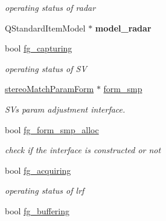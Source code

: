 \begin{DoxyCompactItemize}
\begin{DoxyCompactList}\small\item\em operating status of radar \end{DoxyCompactList}\item 
\hypertarget{class_main_window_a06bc8c3c6a08eafe409ee2bafe0ffbd6}{}Q\+Standard\+Item\+Model $\ast$ {\bfseries model\+\_\+radar}\label{class_main_window_a06bc8c3c6a08eafe409ee2bafe0ffbd6}

\item 
\hypertarget{class_main_window_aa898201d6efa2132f8bbec5b0cb2a54b}{}bool \hyperlink{class_main_window_aa898201d6efa2132f8bbec5b0cb2a54b}{fg\+\_\+capturing}\label{class_main_window_aa898201d6efa2132f8bbec5b0cb2a54b}

\begin{DoxyCompactList}\small\item\em operating status of S\+V \end{DoxyCompactList}\item 
\hypertarget{class_main_window_af7d1fe5d2623ace2d8c2918374297618}{}\hyperlink{classstereo_match_param_form}{stereo\+Match\+Param\+Form} $\ast$ \hyperlink{class_main_window_af7d1fe5d2623ace2d8c2918374297618}{form\+\_\+smp}\label{class_main_window_af7d1fe5d2623ace2d8c2918374297618}

\begin{DoxyCompactList}\small\item\em S\+V\textquotesingle{}s param adjustment interface. \end{DoxyCompactList}\item 
\hypertarget{class_main_window_a05652b564abf3a6635f91bde9ade409b}{}bool \hyperlink{class_main_window_a05652b564abf3a6635f91bde9ade409b}{fg\+\_\+form\+\_\+smp\+\_\+alloc}\label{class_main_window_a05652b564abf3a6635f91bde9ade409b}

\begin{DoxyCompactList}\small\item\em check if the interface is constructed or not \end{DoxyCompactList}\item 
\hypertarget{class_main_window_a0bcdd69d3175e040c086b3e5e6821f67}{}bool \hyperlink{class_main_window_a0bcdd69d3175e040c086b3e5e6821f67}{fg\+\_\+acquiring}\label{class_main_window_a0bcdd69d3175e040c086b3e5e6821f67}

\begin{DoxyCompactList}\small\item\em operating status of lrf \end{DoxyCompactList}\item 
\hypertarget{class_main_window_a783bea3455245d7409bf47171e792643}{}bool \hyperlink{class_main_window_a783bea3455245d7409bf47171e792643}{fg\+\_\+buffering}\label{class_main_window_a783bea3455245d7409bf47171e792643}


\end{DoxyCompactItemize}
